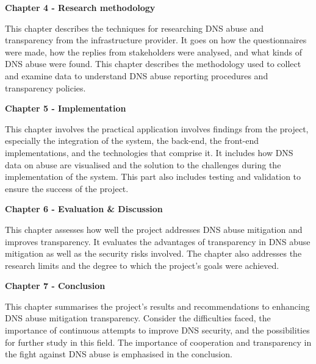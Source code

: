 \textbf{Chapter 4 -  Research methodology }

This chapter describes the techniques for researching DNS abuse and transparency from the infrastructure provider. It goes on how the questionnaires were made, how the replies from stakeholders were analysed, and what kinds of DNS abuse were found. This chapter describes the methodology used to collect and examine data to understand DNS abuse reporting procedures and transparency policies.

\textbf{Chapter 5 -  Implementation }

This chapter involves the practical application involves findings from the project, especially the integration of the system, the back-end, the front-end implementations, and the technologies that comprise it. It includes how DNS data on abuse are visualised and the solution to the challenges during the implementation of the system. This part also includes testing and validation to ensure the success of the project.

\textbf{Chapter 6 -  Evaluation \& Discussion }

This chapter assesses how well the project addresses DNS abuse mitigation and improves transparency. It evaluates the advantages of transparency in DNS abuse mitigation as well as the security risks involved. The chapter also addresses the research limits and the degree to which the project's goals were achieved.

\textbf{Chapter 7 -  Conclusion }

This chapter summarises the project's results and recommendations to enhancing DNS abuse mitigation transparency. Consider the difficulties faced, the importance of continuous attempts to improve DNS security, and the possibilities for further study in this field. The importance of cooperation and transparency in the fight against DNS abuse is emphasised in the conclusion. 
